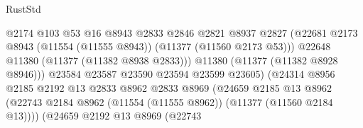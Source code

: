 \begin{lexlean}{RustStd}
\begin{coremodule}
                                              @2174
                                              @103
                                              @53
                                              @16
                                              @8943
                                              @2833
                                              @2846
                                              @2821
                                              @8937
                                              @2827
                                              (@22681
                                                @2173
                                                @8943
                                                (@11554 (@11555 @8943))
                                                (@11377 (@11560 @2173 @53)))
                                              @22648
                                              @11380
                                              (@11377 (@11382 @8938 @2833)))
                                            @11380
                                            (@11377 (@11382 @8928 @8946)))
                                          @23584
                                          @23587
                                          @23590
                                          @23594
                                          @23599
                                          @23605)
                                        (@24314
                                          @8956
                                          @2185
                                          @2192
                                          @13
                                          @2833
                                          @8962
                                          @2833
                                          @8969
                                          (@24659
                                            @2185
                                            @13
                                            @8962
                                            (@22743
                                              @2184
                                              @8962
                                              (@11554 (@11555 @8962))
                                              (@11377 (@11560 @2184 @13))))
                                          (@24659
                                            @2192
                                            @13
                                            @8969
                                            (@22743

\end{coremodule}
\end{lexlean}
